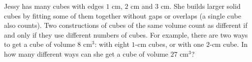 Jessy has many cubes with edges $1$ cm, $2$ cm and $3$ cm. She builds larger solid cubes by fitting some of them together without gaps or overlaps (a single cube also counts). Two constructions of cubes of the same volume count as different if and only if they use different numbers of cubes. For example, there are two ways to get a cube of volume $8\text{ cm}^3$: with eight $1$-cm cubes, or with one $2$-cm cube. In how many different ways can she get a cube of volume $27\text{ cm}^3$?
